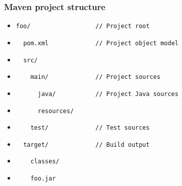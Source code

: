 \documentclass[10pt,xcolor=pdflatex]{beamer}
\begin{document}
\begin{frame}[fragile]\frametitle{Maven project structure}
\begin{itemize}
    \item[] \verb+foo/                  // Project root+
    \item[] \verb+  pom.xml             // Project object model+
    \item[] \verb+  src/               +
    \item[] \verb+    main/             // Project sources+
    \item[] \verb+      java/           // Project Java sources+
    \item[] \verb+      resources/+
    \item[] \verb+    test/             // Test sources+
    \item[] \verb+  target/             // Build output+
    \item[] \verb+    classes/+
    \item[] \verb+    foo.jar+
\end{itemize}
\end{frame}
\end{document}
